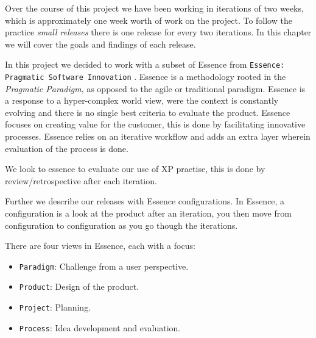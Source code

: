 Over the course of this project we have been working in iterations of two weeks, which is approximately one week worth of work on the project. To follow the practice \textit{small releases} there is one release for every two iterations. In this chapter we will cover the goals and findings of each release.

In this project we decided to work with a subset of Essence from \texttt{Essence: Pragmatic Software Innovation} \citep{essence:config}. Essence is a methodology rooted in the \textit{Pragmatic Paradigm}, as opposed to the agile or traditional paradigm. Essence is a response to a hyper-complex world view, were the context is constantly evolving and there is no single best criteria to evaluate the product. Essence focuses on creating value for the customer, this is done by facilitating innovative processes. Essence relies on an iterative workflow and adds an extra layer wherein evaluation of the process is done. 

We look to essence to evaluate our use of XP practise, this is done by review/retrospective after each iteration.

Further we describe our releases with Essence configurations. In Essence, a configuration is a look at the product after an iteration, you then move from configuration to configuration as you go though the iterations. 

There are four views in Essence, each with a focus: 
\begin{itemize}
\item \texttt{Paradigm}: Challenge from a user perspective.
\item \texttt{Product}: Design of the product.
\item \texttt{Project}: Planning.
\item \texttt{Process}: Idea development and evaluation.
\end{itemize}



